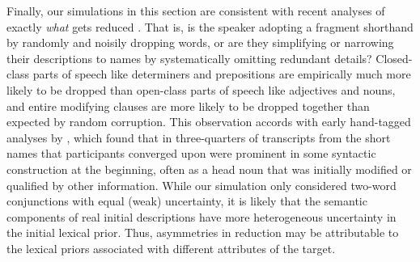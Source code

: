 Finally, our simulations in this section are consistent with recent analyses of exactly \emph{what} gets reduced \cite{hawkins2020characterizing}.
That is, is the speaker adopting a fragment shorthand by randomly and noisily dropping words, or are they simplifying or narrowing their descriptions to names by systematically omitting redundant details?
Closed-class parts of speech like determiners and prepositions are empirically much more likely to be dropped than open-class parts of speech like adjectives and nouns, and entire modifying clauses are more likely to be dropped together than expected by random corruption.
This observation accords with early hand-tagged analyses by , which found that in three-quarters of transcripts from  the short names that participants converged upon were prominent in some syntactic construction at the beginning, often as a head noun that was initially modified or qualified by other information. 
While our simulation only considered two-word conjunctions with equal (weak) uncertainty, it is likely that the semantic components of real initial descriptions have more heterogeneous uncertainty in the initial lexical prior.
Thus, asymmetries in reduction may be attributable to the lexical priors associated with different attributes of the target.

